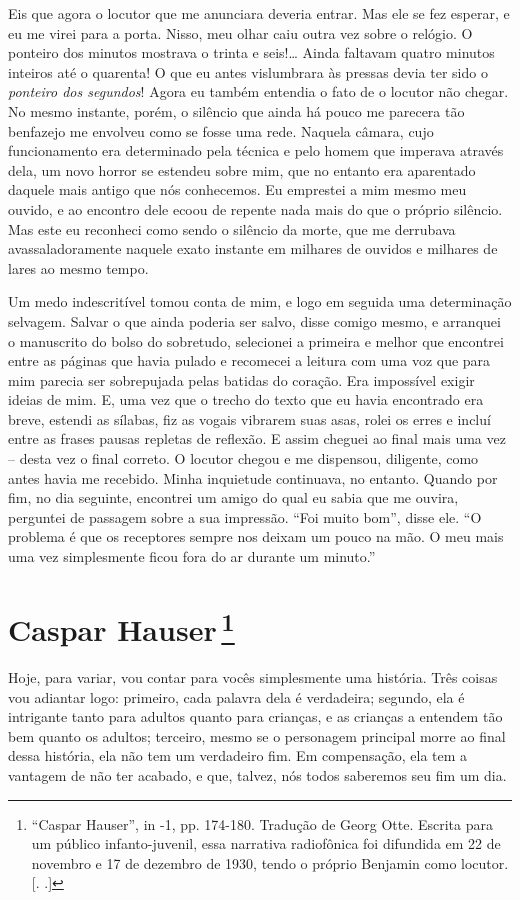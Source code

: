 Eis que agora o locutor que me anunciara deveria entrar. Mas ele se fez
esperar, e eu me virei para a porta. Nisso, meu olhar caiu outra vez
sobre o relógio. O ponteiro dos minutos mostrava o trinta e seis!\ldots{}
Ainda faltavam quatro minutos inteiros até o quarenta! O que eu antes
vislumbrara às pressas devia ter sido o \emph{ponteiro dos segundos}!
Agora eu também entendia o fato de o locutor não chegar. No mesmo
instante, porém, o silêncio que ainda há pouco me parecera tão benfazejo
me envolveu como se fosse uma rede. Naquela câmara, cujo funcionamento
era determinado pela técnica e pelo homem que imperava através dela, um
novo horror se estendeu sobre mim, que no entanto era aparentado daquele
mais antigo que nós conhecemos. Eu emprestei a mim mesmo meu ouvido, e
ao encontro dele ecoou de repente nada mais do que o próprio silêncio.
Mas este eu reconheci como sendo o silêncio da morte, que me derrubava
avassaladoramente naquele exato instante em milhares de ouvidos e
milhares de lares ao mesmo tempo.

Um medo indescritível tomou conta de mim, e logo em seguida uma
determinação selvagem. Salvar o que ainda poderia ser salvo, disse
comigo mesmo, e arranquei o manuscrito do bolso do sobretudo, selecionei
a primeira e melhor que encontrei entre as páginas que havia pulado e
recomecei a leitura com uma voz que para mim parecia ser sobrepujada
pelas batidas do coração. Era impossível exigir ideias de mim. E, uma
vez que o trecho do texto que eu havia encontrado era breve, estendi as
sílabas, fiz as vogais vibrarem suas asas, rolei os erres e incluí entre
as frases pausas repletas de reflexão. E assim cheguei ao final mais uma
vez -- desta vez o final correto. O locutor chegou e me dispensou,
diligente, como antes havia me recebido. Minha inquietude continuava, no
entanto. Quando por fim, no dia seguinte, encontrei um amigo do qual eu
sabia que me ouvira, perguntei de passagem sobre a sua impressão. ``Foi
muito bom'', disse ele. ``O problema é que os receptores sempre nos
deixam um pouco na mão. O meu mais uma vez simplesmente ficou fora do ar
durante um minuto.''

\chapter{Caspar Hauser\,\footnote[*]{``Caspar Hauser'', in  -1,
  pp. 174-180. Tradução de Georg Otte. Escrita para um público
  infanto-juvenil, essa narrativa radiofônica foi difundida em 22 de
  novembro e 17 de dezembro de 1930, tendo o próprio Benjamin como
  locutor. [. .]} }
Hoje, para variar, vou contar para vocês simplesmente uma história. Três
coisas vou adiantar logo: primeiro, cada palavra dela é verdadeira;
segundo, ela é intrigante tanto para adultos quanto para crianças, e as
crianças a entendem tão bem quanto os adultos; terceiro, mesmo se o
personagem principal morre ao final dessa história, ela não tem um
verdadeiro fim. Em compensação, ela tem a vantagem de não ter acabado, e
que, talvez, nós todos saberemos seu fim um dia.

